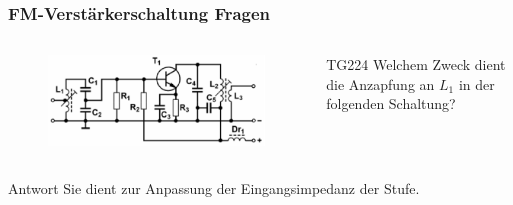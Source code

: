 \begin{frame}
  \frametitle{FM-Verstärkerschaltung Fragen}
  \begin{columns}
    \begin{figure}
      \includegraphics[width=1\textwidth,height=.5\textheight,keepaspectratio]{a07/TG222.png}
    \end{figure}
    \begin{center}
      \begin{exampleblock}{TG224}
        Welchem Zweck dient die Anzapfung an $L_1$ in der folgenden Schaltung?
      \end{exampleblock}
    \end{center}
  \end{columns}
  \pause
  \begin{exampleblock}{Antwort}
    Sie dient zur Anpassung der Eingangsimpedanz der Stufe.
  \end{exampleblock}
\end{frame}

